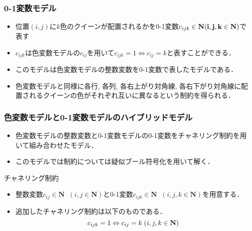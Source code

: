 \begin{frame}\small
    \frametitle{0-1変数モデル}
    \setlength{\abovedisplayskip}{1pt} %
    \setlength{\belowdisplayskip}{1pt} %
    \begin{block}{}
        \begin{itemize}
            \item 位置$(i, j)$に$k$色のクイーンが配置されるかを0-1変数$c_{ijk} \in \bf N (i, j, k \in \bf N)$で表す
            \item $c_{ijk}$は色変数モデルの$c_{ij}$を用いて$c_{ijk}=1 \Leftrightarrow c_{ij}=k$と表すことができる．
            \item このモデルは色変数モデルの整数変数を0-1変数で表したモデルである．
            \item 色変数モデルと同様に\alert{各行}, \alert{各列}, \alert{各右上がり対角線}, \alert{各右下がり対角線}に配置されるクイーンの色がそれぞれ互いに異なるという制約を得られる．
        \end{itemize}
    \end{block}
\end{frame}
\begin{frame}[fragile]\small
    \frametitle{色変数モデルと0-1変数モデルのハイブリッドモデル}
    \begin{itemize}
        \item 色変数モデルの整数変数と0-1変数モデルの0-1変数をチャネリング制約を用いて組み合わせたモデル．
        \item このモデルでは{\distinct}制約については疑似ブール符号化を用いて解く．
    \end{itemize}
    \begin{block}{チャネリング制約}
        \begin{itemize}
            \item 整数変数$c_{ij}\in\bm{N} \;\; (i,j\in\bm{N})$と0-1変数$c_{ijk}\in\bm{N} \;\; (i,j,k\in\bm{N})$を用意する．
            \item 追加したチャネリング制約は以下のものである．
                $$ c_{ijk}=1 \Leftrightarrow c_{ij}=k \; (i,j,k \in \bf N)$$
        \end{itemize}
    \end{block}
\end{frame}


